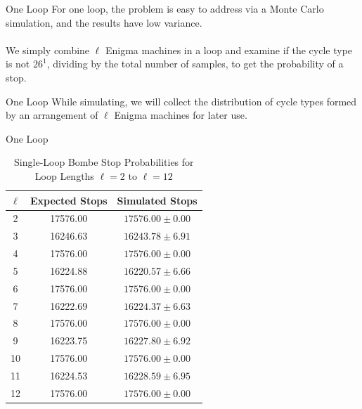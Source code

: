 \documentclass[hyphens,aspectratio=169]{beamer}
\begin{document}
\begin{frame}[fragile]{One Loop}
	For one loop, the problem is easy to address via a Monte Carlo simulation, and the results have low variance.
	\\\\We simply combine $\ell$ Enigma machines in a loop and examine if the cycle type is  not $26^1$, dividing by the total number of samples, to get the probability of a stop.
\end{frame}

\begin{frame}[fragile]{One Loop}
	\large
	While simulating, we will collect the distribution of cycle types formed by an arrangement of $\ell$ Enigma machines for later use.
\end{frame}

\begin{frame}[fragile]{One Loop}
	\begin{table}[H]
		\centering

		\begin{tabular}{|c|c|c|}
			\hline
			{\bf{ $\ell$ }} & {\bf{ Expected Stops }} & {\bf{ Simulated Stops }} \\
			\hline
			2               & 17576.00                & $17576.00 \pm 0.00$      \\
			\hline
			3               & 16246.63                & $16243.78 \pm 6.91$      \\
			\hline
			4               & 17576.00                & $17576.00 \pm 0.00$      \\
			\hline
			5               & 16224.88                & $16220.57 \pm 6.66$      \\
			\hline
			6               & 17576.00                & $17576.00 \pm 0.00$      \\
			\hline
			7               & 16222.69                & $16224.37 \pm 6.63$      \\
			\hline
			8               & 17576.00                & $17576.00 \pm 0.00$      \\
			\hline
			9               & 16223.75                & $16227.80 \pm 6.92$      \\
			\hline
			10              & 17576.00                & $17576.00 \pm 0.00$      \\
			\hline
			11              & 16224.53                & $16228.59 \pm 6.95$      \\
			\hline
			12              & 17576.00                & $17576.00 \pm 0.00$      \\
			\hline
		\end{tabular}
		\caption{Single-Loop Bombe Stop Probabilities for Loop Lengths
			$\ell=2$ to $\ell=12$}
	\end{table}
\end{frame}
\end{document}
